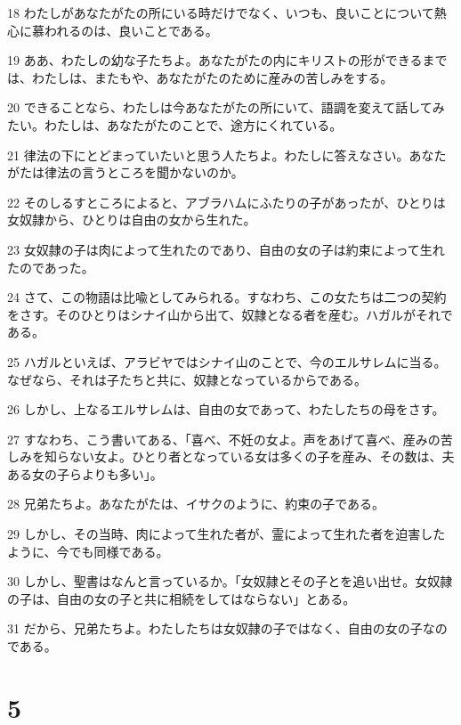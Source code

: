 \par 18 わたしがあなたがたの所にいる時だけでなく、いつも、良いことについて熱心に慕われるのは、良いことである。
\par 19 ああ、わたしの幼な子たちよ。あなたがたの内にキリストの形ができるまでは、わたしは、またもや、あなたがたのために産みの苦しみをする。
\par 20 できることなら、わたしは今あなたがたの所にいて、語調を変えて話してみたい。わたしは、あなたがたのことで、途方にくれている。
\par 21 律法の下にとどまっていたいと思う人たちよ。わたしに答えなさい。あなたがたは律法の言うところを聞かないのか。
\par 22 そのしるすところによると、アブラハムにふたりの子があったが、ひとりは女奴隷から、ひとりは自由の女から生れた。
\par 23 女奴隷の子は肉によって生れたのであり、自由の女の子は約束によって生れたのであった。
\par 24 さて、この物語は比喩としてみられる。すなわち、この女たちは二つの契約をさす。そのひとりはシナイ山から出て、奴隷となる者を産む。ハガルがそれである。
\par 25 ハガルといえば、アラビヤではシナイ山のことで、今のエルサレムに当る。なぜなら、それは子たちと共に、奴隷となっているからである。
\par 26 しかし、上なるエルサレムは、自由の女であって、わたしたちの母をさす。
\par 27 すなわち、こう書いてある、「喜べ、不妊の女よ。声をあげて喜べ、産みの苦しみを知らない女よ。ひとり者となっている女は多くの子を産み、その数は、夫ある女の子らよりも多い」。
\par 28 兄弟たちよ。あなたがたは、イサクのように、約束の子である。
\par 29 しかし、その当時、肉によって生れた者が、霊によって生れた者を迫害したように、今でも同様である。
\par 30 しかし、聖書はなんと言っているか。「女奴隷とその子とを追い出せ。女奴隷の子は、自由の女の子と共に相続をしてはならない」とある。
\par 31 だから、兄弟たちよ。わたしたちは女奴隷の子ではなく、自由の女の子なのである。

\chapter{5}

